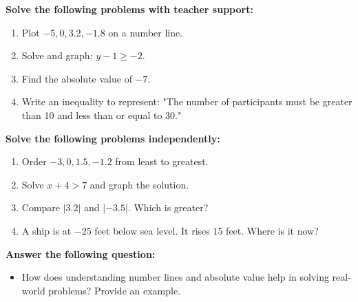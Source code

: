 \documentclass[12pt]{article}
\begin{document}
\begin{tcolorbox}[colframe=black!60, colback=white, 
coltitle=black, colbacktitle=black!15, fonttitle=\bfseries\Large, 
title=Guided Practice, halign title=center, left=10pt, right=10pt, top=10pt, bottom=45pt]
\textbf{Solve the following problems with teacher support:}
\begin{enumerate}[itemsep=3em]
    \item Plot \( -5, 0, 3.2, -1.8 \) on a number line.
    \item Solve and graph: \( y - 1 \geq -2 \).
    \item Find the absolute value of \( -7 \).
    \item Write an inequality to represent: "The number of participants must be greater than 10 and less than or equal to 30."
\end{enumerate}
\end{tcolorbox}

\begin{tcolorbox}[colframe=black!60, colback=white, 
coltitle=black, colbacktitle=black!15, fonttitle=\bfseries\Large, 
title=Independent Practice, halign title=center, left=10pt, right=10pt, top=10pt, bottom=45pt]
\textbf{Solve the following problems independently:}
\begin{enumerate}[itemsep=3em]
    \item Order \( -3, 0, 1.5, -1.2 \) from least to greatest.
    \item Solve \( x + 4 > 7 \) and graph the solution.
    \item Compare \( |3.2| \) and \( |-3.5| \). Which is greater?
    \item A ship is at \( -25 \) feet below sea level. It rises \( 15 \) feet. Where is it now?
\end{enumerate}
\end{tcolorbox}

\begin{tcolorbox}[colframe=black!60, colback=white, 
coltitle=black, colbacktitle=black!15, fonttitle=\bfseries\Large, 
title=Exit Ticket, halign title=center, left=10pt, right=10pt, top=10pt, bottom=110pt]
\textbf{Answer the following question:}
\begin{itemize}
    \item How does understanding number lines and absolute value help in solving real-world problems? Provide an example.
\end{itemize}
\end{tcolorbox}
\end{document}
